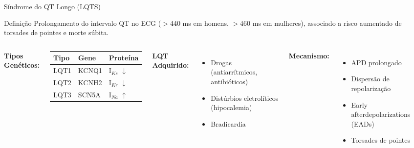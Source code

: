 \begin{frame}{Síndrome do QT Longo (LQTS)}
\begin{block}{Definição}
Prolongamento do intervalo QT no ECG ($>$440 ms em homens, $>$460 ms em mulheres), associado a risco aumentado de torsades de pointes e morte súbita.
\end{block}

\vspace{0.3cm}

\begin{columns}
\textbf{Tipos Genéticos:}
\begin{center}
\begin{tabular}{lll}
\toprule
\textbf{Tipo} & \textbf{Gene} & \textbf{Proteína} \\
\midrule
LQT1 & KCNQ1 & I$_{Ks}$ $\downarrow$ \\
LQT2 & KCNH2 & I$_{Kr}$ $\downarrow$ \\
LQT3 & SCN5A & I$_{Na}$ $\uparrow$ \\
\bottomrule
\end{tabular}
\end{center}

\vspace{0.3cm}

\textbf{LQT Adquirido:}
\begin{itemize}
    \item Drogas (antiarrítmicos, antibióticos)
    \item Distúrbios eletrolíticos (hipocalemia)
    \item Bradicardia
\end{itemize}

\textbf{Mecanismo:}
\begin{itemize}
    \item APD prolongado
    \item Dispersão de repolarização
    \item Early afterdepolarizations (EADs)
    \item Torsades de pointes
\end{itemize}

\vspace{0.3cm}

\begin{center}
\end{center}
\end{columns}
\end{frame}
